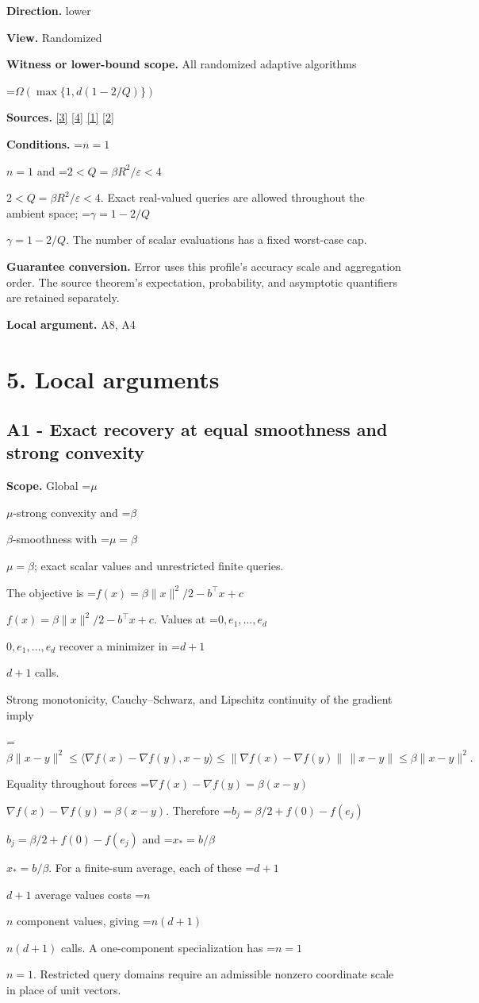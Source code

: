 \documentclass[10pt,a4paper]{article}
\newcommand{\AtlasMath}[1]{\par\begingroup\centering\setbox0=\hbox{$\displaystyle #1$}\ifdim\wd0>1.4\linewidth\typeout{ATLAS WIDE FORMULA: \the\wd0}\fi\ifdim\wd0>\linewidth\resizebox{\linewidth}{!}{\box0}\else\box0\fi\par\endgroup}
\newcommand{\AtlasInlineMath}[1]{\begingroup\setbox0=\hbox{$#1$}\ifdim\wd0>.4\linewidth\endgroup\AtlasMath{#1}\else\endgroup$#1$\fi}
\begin{document}
\textbf{Direction.} lower

\textbf{View.} Randomized

\textbf{Witness or lower-bound scope.} All randomized adaptive algorithms

\AtlasMath{\Omega(\max\{1,d(1-2/Q)\})}
\textbf{Sources.} \href{https://arxiv.org/html/2607.16558v2}{[3]} \href{https://www.mathnet.ru/php/archive.phtml?jrnid=mzm&option_lang=eng&paperid=1697&wshow=paper}{[4]} \href{https://arxiv.org/html/2610.00345v1}{[1]} \href{https://arxiv.org/abs/2109.08858}{[2]}

\textbf{Conditions.} \AtlasInlineMath{n=1} and \AtlasInlineMath{2<Q=\beta R^2/\varepsilon<4}. Exact real-valued queries are allowed throughout the ambient space; \AtlasInlineMath{\gamma=1-2/Q}. The number of scalar evaluations has a fixed worst-case cap.

\textbf{Guarantee conversion.} Error uses this profile's accuracy scale and aggregation order. The source theorem's expectation, probability, and asymptotic quantifiers are retained separately.

\textbf{Local argument.} A8, A4

\section{5. Local arguments}
\subsection{A1 - Exact recovery at equal smoothness and strong convexity}
\textbf{Scope.} Global \AtlasInlineMath{\mu}-strong convexity and \AtlasInlineMath{\beta}-smoothness with \AtlasInlineMath{\mu=\beta}; exact scalar values and unrestricted finite queries.

The objective is \AtlasInlineMath{f(x)=\beta\|x\|^2/2-b^\top x+c}. Values at \AtlasInlineMath{0,e_1,\ldots,e_d} recover a minimizer in \AtlasInlineMath{d+1} calls.

Strong monotonicity, Cauchy--Schwarz, and Lipschitz continuity of the gradient imply

\AtlasMath{\beta\|x-y\|^2\le\langle\nabla f(x)-\nabla f(y),x-y\rangle\le\|\nabla f(x)-\nabla f(y)\|\,\|x-y\|\le\beta\|x-y\|^2.}

Equality throughout forces \AtlasInlineMath{\nabla f(x)-\nabla f(y)=\beta(x-y)}. Therefore \AtlasInlineMath{b_j=\beta/2+f(0)-f(e_j)} and \AtlasInlineMath{x_*=b/\beta}. For a finite-sum average, each of these \AtlasInlineMath{d+1} average values costs \AtlasInlineMath{n} component values, giving \AtlasInlineMath{n(d+1)} calls. A one-component specialization has \AtlasInlineMath{n=1}. Restricted query domains require an admissible nonzero coordinate scale in place of unit vectors.
\end{document}
